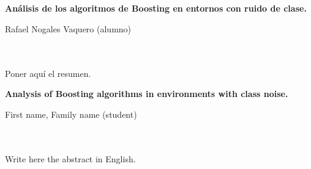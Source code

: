 \chapter*{}






\cleardoublepage
\thispagestyle{empty}

\begin{center}
{\large\bfseries Análisis de los algoritmos de Boosting en entornos con ruido de clase.}\\
\end{center}
\begin{center}
Rafael Nogales Vaquero (alumno)\\
\end{center}

\\

\vspace{0.7cm}
\\

Poner aquí el resumen.
\cleardoublepage


\thispagestyle{empty}


\begin{center}
{\large\bfseries Analysis of Boosting algorithms in environments with class noise.}\\
\end{center}
\begin{center}
First name, Family name (student)\\
\end{center}

\\

\vspace{0.7cm}
\\

Write here the abstract in English.

\chapter*{}
\thispagestyle{empty}


